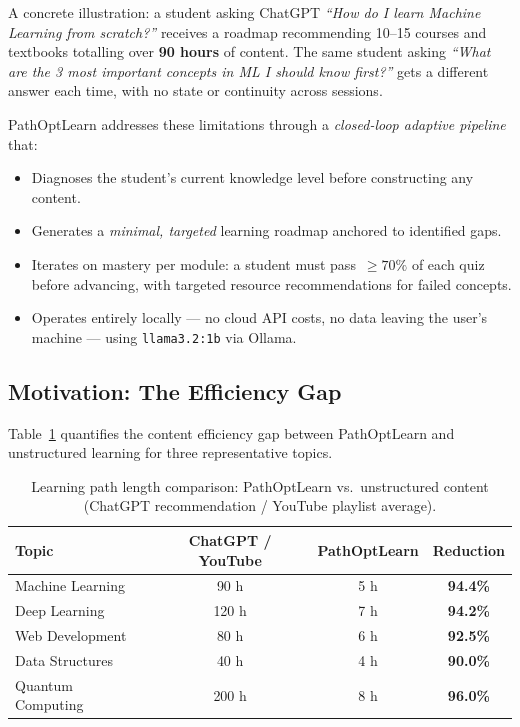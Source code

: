 \documentclass[12pt,a4paper]{article}
\begin{document}
A concrete illustration: a student asking ChatGPT \emph{``How do I learn
Machine Learning from scratch?''} receives a roadmap recommending 10--15
courses and textbooks totalling over \textbf{90 hours} of content. The same
student asking \emph{``What are the 3 most important concepts in ML I should
know first?''} gets a different answer each time, with no state or
continuity across sessions.

PathOptLearn addresses these limitations through a \emph{closed-loop
adaptive pipeline} that:

\begin{itemize}
  \item Diagnoses the student's current knowledge level before constructing any content.
  \item Generates a \emph{minimal, targeted} learning roadmap anchored to identified gaps.
  \item Iterates on mastery per module: a student must pass~$\geq 70\%$ of
    each quiz before advancing, with targeted resource recommendations for
    failed concepts.
  \item Operates entirely locally — no cloud API costs, no data leaving the
    user's machine — using \texttt{llama3.2:1b} via Ollama.
\end{itemize}

\subsection{Motivation: The Efficiency Gap}

Table~\ref{tab:efficiency} quantifies the content efficiency gap between
PathOptLearn and unstructured learning for three representative topics.

\begin{table}[H]
  \centering
  \caption{Learning path length comparison: PathOptLearn vs.\ unstructured
  content (ChatGPT recommendation / YouTube playlist average).}
  \label{tab:efficiency}
  \begin{tabular}{@{}lccc@{}}
    \toprule
    \textbf{Topic} & \textbf{ChatGPT / YouTube} & \textbf{PathOptLearn} & \textbf{Reduction} \\
    \midrule
    Machine Learning  & 90 h  & 5 h  & \textbf{94.4\%} \\
    Deep Learning     & 120 h & 7 h  & \textbf{94.2\%} \\
    Web Development   & 80 h  & 6 h  & \textbf{92.5\%} \\
    Data Structures   & 40 h  & 4 h  & \textbf{90.0\%} \\
    Quantum Computing & 200 h & 8 h  & \textbf{96.0\%} \\
    \bottomrule
  \end{tabular}
\end{table}
\end{document}
